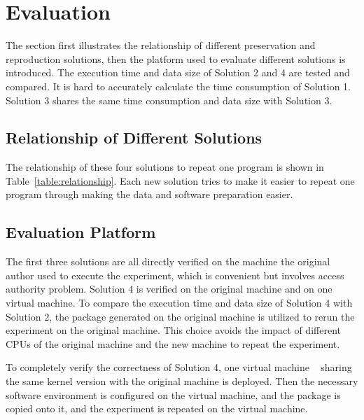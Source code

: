 \documentclass{sig-alternate}
\begin{document}

\section{Evaluation}
The section first illustrates the relationship of different preservation and reproduction solutions, then the platform used to evaluate different solutions is introduced. The execution time and data size of Solution 2 and 4 are tested and compared. It is hard to accurately calculate the time consumption of Solution 1. Solution 3 shares the same time consumption and data size with Solution 3.

\subsection{Relationship of Different Solutions}
The relationship of these four solutions to repeat one program is shown in Table~\ref{table:relationship}. Each new solution tries to make it easier to repeat one program through making the data and software preparation easier.

\subsection{Evaluation Platform}

The first three solutions are all directly verified on the machine the original
author used to execute the experiment, which is convenient but involves access
authority problem. Solution 4 is verified on the original machine and on one virtual machine.
To compare the execution time and data size of Solution 4
with Solution 2, the package generated on the original machine is utilized to
rerun the experiment on the original machine. This choice avoids the impact of
different CPUs of the original machine and the new machine to repeat the
experiment. 

To completely verify the correctness of Solution 4, one virtual
machine ~\cite{goldberg1974survey} sharing the same kernel version with the original machine is deployed.
Then the necessary software environment is configured on the virtual machine,
and the package is copied onto it, and the
experiment is repeated on the virtual machine.
\end{document}
